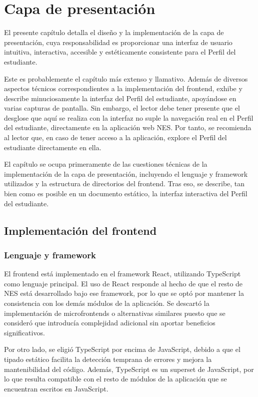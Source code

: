 \chapter{Capa de presentación}

El presente capítulo detalla el diseño y la implementación de la capa de presentación, cuya responsabilidad es proporcionar una interfaz de usuario intuitiva, interactiva, accesible y estéticamente consistente para el Perfil del estudiante. 

Este es probablemente el capítulo más extenso y llamativo. Además de diversos aspectos técnicos correspondientes a la implementación del \gls{frontend}, exhibe y describe minuciosamente la interfaz del Perfil del estudiante, apoyándose en varias capturas de pantalla. Sin embargo, el lector debe tener presente que el desglose que aquí se realiza con la interfaz no suple la navegación real en el Perfil del estudiante, directamente en la aplicación web \gls{NES}. Por tanto, se recomienda al lector que, en caso de tener acceso a la aplicación, explore el Perfil del estudiante directamente en ella.

El capítulo se ocupa primeramente de las cuestiones técnicas de la implementación de la capa de presentación, incluyendo el lenguaje y framework utilizados y la estructura de directorios del frontend. Tras eso, se describe, tan bien como es posible en un documento estático, la interfaz interactiva del Perfil del estudiante.

\section{Implementación del frontend}

\subsection{Lenguaje y framework}

El frontend está implementado en el framework \gls{React}, utilizando \gls{TypeScript} como lenguaje principal. El uso de React responde al hecho de que el resto de \gls{NES} está desarrollado bajo ese framework, por lo que se optó por mantener la consistencia con los demás módulos de la aplicación. Se descartó la implementación de microfrontends o alternativas similares puesto que se consideró que introducía complejidad adicional sin aportar beneficios significativos.

Por otro lado, se eligió \gls{TypeScript} por encima de \gls{JavaScript}, debido a que el tipado estático facilita la detección temprana de errores y mejora la mantenibilidad del código. Además, \gls{TypeScript} es un superset de \gls{JavaScript}, por lo que resulta compatible con el resto de módulos de la aplicación que se encuentran escritos en \gls{JavaScript}.

